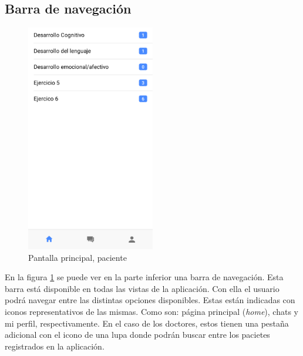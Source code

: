 \subsection{Barra de navegación}
\begin{figure}[!h]
    \centering
    \includegraphics[width=0.5\textwidth]{images/screenshots/Paciente-ventana-principal.png}
    \caption{Pantalla principal, paciente}
    \label{pantalla-principal-paciente}
\end{figure}

En la figura \ref{pantalla-principal-paciente} se puede ver en la parte
inferior una barra de navegación. Esta barra está disponible en todas las
vistas de la aplicación. Con ella el usuario podrá navegar entre las
distintas opciones disponibles. Estas están indicadas con iconos
representativos de las mismas. Como son: página principal (\textit{home}),
chats y mi perfil, respectivamente. En el caso de los doctores, estos tienen
una pestaña adicional con el icono de una lupa donde podrán buscar entre los
pacietes registrados en la aplicación.
\clearpage

